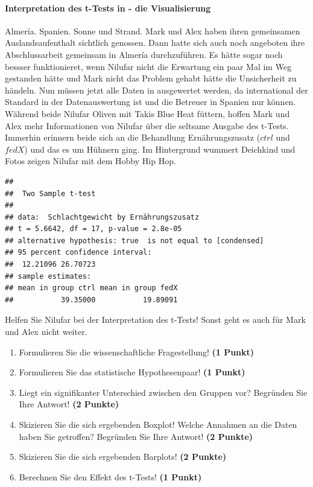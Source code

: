 \documentclass[a4paper, 9pt]{scrartcl}\usepackage[]{graphicx}\usepackage[]{xcolor}
\makeatletter
\newenvironment{kframe}{%
 \def\at@end@of@kframe{}%
 \ifinner\ifhmode%
  \def\at@end@of@kframe{\end{minipage}}%
  \begin{minipage}{\columnwidth}%
 \fi\fi%
 \def\FrameCommand##1{\hskip\@totalleftmargin \hskip-\fboxsep
 \colorbox{shadecolor}{##1}\hskip-\fboxsep
     \hskip-\linewidth \hskip-\@totalleftmargin \hskip\columnwidth}%
 \MakeFramed {\advance\hsize-\width
   \@totalleftmargin\z@ \linewidth\hsize
   \@setminipage}}%
 {\par\unskip\endMakeFramed%
 \at@end@of@kframe}
\newenvironment{knitrout}{}{} %
\makeatother
\begin{document}
\ifcollection
\paragraph{Interpretation des t-Tests in \Rlogo - die Visualisierung}
\fi

Almería. Spanien. Sonne und Strand. Mark und Alex haben ihren gemeinsamen Auslandsaufenthalt sichtlich genossen. Dann hatte sich auch noch angeboten ihre Abschlussarbeit gemeinsam in Almería durchzuführen. Es hätte sogar noch bessser funktionieret, wenn Nilufar nicht die Erwartung ein paar Mal im Weg gestanden hätte und Mark nicht das Problem gehabt hätte die Unsicherheit zu händeln. Nun müssen jetzt alle Daten in \Rlogo ausgewertet werden, da \Rlogo international der Standard in der Datenauswertung ist und die Betreuer in Spanien nur \Rlogo können. Während beide Nilufar Oliven mit Takis Blue Heat füttern, hoffen Mark und Alex mehr Informationen von Nilufar über die seltsame \Rlogo Ausgabe des t-Tests. Immerhin erinnern beide sich an die Behandlung Ernährungszusatz ($ctrl$ und $fedX$) und das es um Hühnern ging. Im Hintergrund wummert Deichkind und Fotos zeigen Nilufar mit dem Hobby Hip Hop.

\begin{knitrout}
\color{fgcolor}\begin{kframe}
\begin{verbatim}
## 
## 	Two Sample t-test
## 
## data:  Schlachtgewicht by Ernährungszusatz
## t = 5.6642, df = 17, p-value = 2.8e-05
## alternative hypothesis: true  is not equal to [condensed]
## 95 percent confidence interval:
##  12.21096 26.70723
## sample estimates:
## mean in group ctrl mean in group fedX 
##           39.35000           19.89091
\end{verbatim}
\end{kframe}
\end{knitrout}

Helfen Sie Nilufar bei der Interpretation des t-Tests! Sonst geht es auch für Mark und Alex nicht weiter.
  
\begin{enumerate}
  \item Formulieren Sie die wissenschaftliche Fragestellung! \textbf{(1 Punkt)}
  \item Formulieren Sie das statistische Hypothesenpaar! \textbf{(1 Punkt)}
\item Liegt ein signifikanter Unterschied zwischen den Gruppen vor? Begründen Sie Ihre Antwort! \textbf{(2 Punkte)}
\item Skizieren Sie die sich ergebenden Boxplot! Welche Annahmen an die Daten haben Sie getroffen? Begründen Sie Ihre
  Antwort! \textbf{(2 Punkte)} 
\item Skizieren Sie die sich ergebenden Barplots! \textbf{(2 Punkte)}
\item Berechnen Sie den Effekt des t-Tests! \textbf{(1 Punkt)}
\end{enumerate}
 
\end{document}
